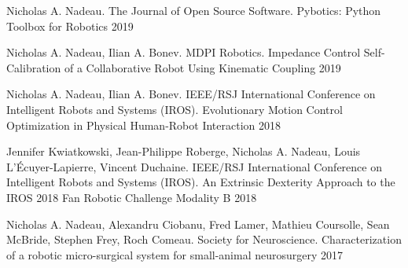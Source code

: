 \begin{cventries}

\cventry
{Nicholas A. Nadeau. The Journal of Open Source Software.}
{Pybotics: Python Toolbox for Robotics}
{}
{2019}
{}

\cventry
{Nicholas A. Nadeau, Ilian A. Bonev. MDPI Robotics.}
{Impedance Control Self-Calibration of a Collaborative Robot Using Kinematic Coupling}
{}
{2019}
{}

\cventry
{Nicholas A. Nadeau, Ilian A. Bonev. IEEE/RSJ International Conference on Intelligent Robots and Systems (IROS).}
{Evolutionary Motion Control Optimization in Physical Human-Robot Interaction}
{}
{2018}
{}

\cventry
{Jennifer Kwiatkowski, Jean-Philippe Roberge, Nicholas A. Nadeau, Louis L'Écuyer-Lapierre, Vincent Duchaine. IEEE/RSJ International Conference on Intelligent Robots and Systems (IROS).}
{An Extrinsic Dexterity Approach to the IROS 2018 Fan Robotic Challenge Modality B}
{}
{2018}
{}

\cventry
{Nicholas A. Nadeau, Alexandru Ciobanu, Fred Lamer, Mathieu Coursolle, Sean McBride, Stephen Frey, Roch Comeau. Society for Neuroscience.}
{Characterization of a robotic micro-surgical system for small-animal neurosurgery}
{}
{2017}
{}

\end{cventries}